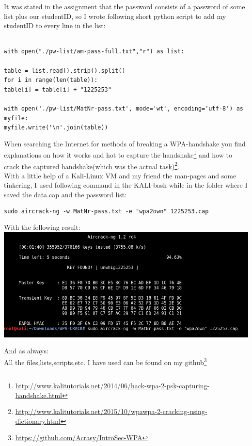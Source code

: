 \documentclass{scrartcl}
\begin{document}
It was stated in the assignment that the password consists of a password of some list plus our studentID, so I wrote following short python script to add my studentID to every line in the list:

\begin{lstlisting}

with open("./pw-list/am-pass-full.txt","r") as list:

table = list.read().strip().split()
for i in range(len(table)):
table[i] = table[i] + "1225253"

with open('./pw-list/MatNr-pass.txt', mode='wt', encoding='utf-8') as myfile:
myfile.write('\n'.join(table))
\end{lstlisting}

When searching the Internet for methods of breaking a WPA-handshake you find explanations on how it works and hot to capture the handshake\footnote{\url{http://www.kalitutorials.net/2014/06/hack-wpa-2-psk-capturing-handshake.html}} and how to crack the captured handshake(which was the actual task)\footnote{\url{http://www.kalitutorials.net/2015/10/wpawpa-2-cracking-using-dictionary.html}}. \\
With a little help of a Kali-Linux VM and my friend the man-pages and some tinkering, I used following command in the KALI-bash while in the folder where I saved the data.cap and the password list:  

\begin{lstlisting}
sudo aircrack-ng -w MatNr-pass.txt -e "wpa2own" 1225253.cap
\end{lstlisting}

With the following result: \\
\includegraphics[scale=0.8]{passwordFound.PNG}	

And as always: \\
All the files,lists,scripts,etc. I have used can be found on my github\footnote{\url{https://github.com/Acrasy/IntroSec-WPA}}
\end{document}
